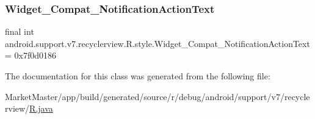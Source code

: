 \subsubsection{\texorpdfstring{Widget\+\_\+\+Compat\+\_\+\+Notification\+Action\+Text}{Widget\_Compat\_NotificationActionText}}
{\footnotesize\ttfamily final int android.\+support.\+v7.\+recyclerview.\+R.\+style.\+Widget\+\_\+\+Compat\+\_\+\+Notification\+Action\+Text = 0x7f0d0186\hspace{0.3cm}{\ttfamily [static]}}



The documentation for this class was generated from the following file\+:\begin{DoxyCompactItemize}
\item 
Market\+Master/app/build/generated/source/r/debug/android/support/v7/recyclerview/\mbox{\hyperlink{debug_2android_2support_2v7_2recyclerview_2R_8java}{R.\+java}}\end{DoxyCompactItemize}
